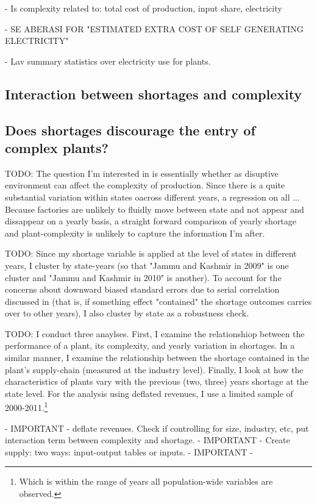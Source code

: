 \documentclass[11pt]{article}
\begin{document}
- Is complexity related to: total cost of production, input share, electricity 

- SE ABERASI FOR "ESTIMATED EXTRA COST OF SELF GENERATING ELECTRICITY"

- Lav summary statistics over electricity use for plants.
\subsection{Interaction between shortages and complexity}%
\label{sub:regressions}


\subsection{Does shortages discourage the entry of complex plants?}%
\label{sub:regressions}
TODO: The question I'm interested in is essentially whether as disuptive environment can affect the complexity of production. Since there is a quite substantial variation within states oacross different years, a regression on all ... Because factories are unlikely to fluidly move between state and not appear and dissappear on a yearly basis, a straight forward comparison of yearly shortage and plant-complexity is unlikely to capture the information I'm after.

TODO: Since my shortage variable is applied at the level of states in different years, I cluster by state-years (so that "Jammu and Kashmir in 2009" is one cluster and "Jammu and Kashmir in 2010" is another). To account for the concerns about downward biased standard errors due to serial correlation discussed in \cite{bertrand_how_2004} (that is, if something effect "contained" the shortage outcomes carries over to other years), I also cluster by state as a robustness check.

TODO: I conduct three anaylses. First, I examine the relationshiop between the performance of a plant, its complexity, and yearly variation in shortages. In a similar manner, I examine the relationship between the shortage contained in the plant's supply-chain (measured at the industry level). Finally, I look at how the characteristics of plants vary with the previous (two, three) years shortage at the state level. For the analysis using deflated revenues, I use a limited sample of 2000-2011.\footnote{Which is within the range of years all population-wide variables are observed.} 

 - IMPORTANT - deflate revenues. Check if controlling for size, industry, etc, put interaction term between complexity and shortage.
 - IMPORTANT - Create supply: two ways: input-output tables or inputs. 
 - IMPORTANT - 
\end{document}
